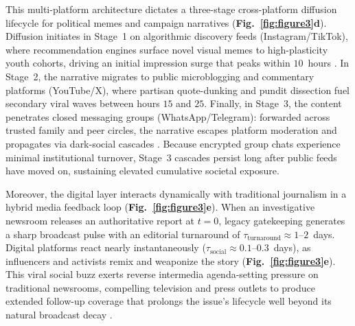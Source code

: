 \documentclass{article}
\begin{document}
This multi-platform architecture dictates a three-stage cross-platform diffusion lifecycle for political memes and campaign narratives (\textbf{Fig.~\ref{fig:figure3}d}). Diffusion initiates in Stage~1 on algorithmic discovery feeds (Instagram/TikTok), where recommendation engines surface novel visual memes to high-plasticity youth cohorts, driving an initial impression surge that peaks within $10$~hours \citep{leskovec2009meme}. In Stage~2, the narrative migrates to public microblogging and commentary platforms (YouTube/X), where partisan quote-dunking and pundit dissection fuel secondary viral waves between hours $15$ and $25$. Finally, in Stage~3, the content penetrates closed messaging groups (WhatsApp/Telegram): forwarded across trusted family and peer circles, the narrative escapes platform moderation and propagates via dark-social cascades \citep{resende2019whatsapp, garimella2020images}. Because encrypted group chats experience minimal institutional turnover, Stage~3 cascades persist long after public feeds have moved on, sustaining elevated cumulative societal exposure.

Moreover, the digital layer interacts dynamically with traditional journalism in a hybrid media feedback loop \citep{chadwick2017hybrid, harder2017intermedia} (\textbf{Fig.~\ref{fig:figure3}e}). When an investigative newsroom releases an authoritative report at $t=0$, legacy gatekeeping generates a sharp broadcast pulse with an editorial turnaround of $\tau_{\mathrm{turnaround}} \approx 1$--$2$~days. Digital platforms react nearly instantaneously ($\tau_{\mathrm{social}} \approx 0.1$--$0.3$~days), as influencers and activists remix and weaponize the story (\textbf{Fig.~\ref{fig:figure3}e}). This viral social buzz exerts reverse intermedia agenda-setting pressure on traditional newsrooms, compelling television and press outlets to produce extended follow-up coverage that prolongs the issue's lifecycle well beyond its natural broadcast decay \citep{harder2017intermedia}.
\end{document}
